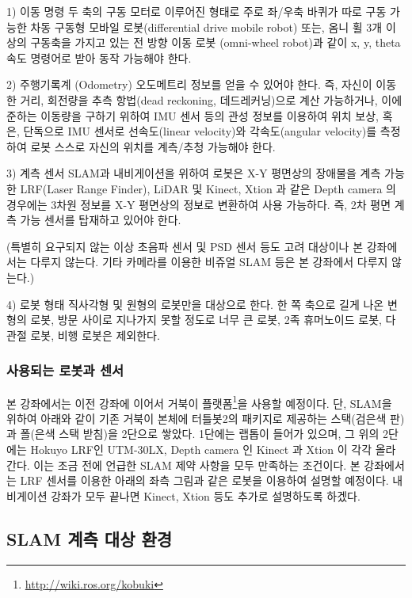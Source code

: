 1) 이동 명령
두 축의 구동 모터로 이루어진 형태로 주로 좌/우축 바퀴가 따로 구동 가능한 차동 구동형 모바일 로봇(differential drive mobile robot) 또는, 옴니 휠 3개 이상의 구동축을 가지고 있는 전 방향 이동 로봇 (omni-wheel robot)과 같이 x, y, theta 속도 명령어로 받아 동작 가능해야 한다.

2) 주행기록계 (Odometry)
오도메트리 정보를 얻을 수 있어야 한다. 즉, 자신이 이동한 거리, 회전량을 추측 항법(dead reckoning, 데드레커닝)으로 계산 가능하거나, 이에 준하는 이동량을 구하기 위하여 IMU 센서 등의 관성 정보를 이용하여 위치 보상, 혹은, 단독으로 IMU 센서로 선속도(linear velocity)와 각속도(angular velocity)를 측정하여 로봇 스스로 자신의 위치를 계측/추청 가능해야 한다.

3) 계측 센서
SLAM과 내비게이션을 위하여 로봇은 X-Y 평면상의 장애물을 계측 가능한 LRF(Laser Range Finder), LiDAR 및 Kinect, Xtion 과 같은 Depth camera 의 경우에는 3차원 정보를 X-Y 평면상의 정보로 변환하여 사용 가능하다. 즉, 2차 평면 계측 가능 센서를 탑재하고 있어야 한다. 

(특별히 요구되지 않는 이상 초음파 센서 및 PSD 센서 등도 고려 대상이나 본 강좌에서는 다루지 않는다. 기타 카메라를 이용한 비쥬얼 SLAM 등은 본 강좌에서 다루지 않는다.)

4) 로봇 형태
직사각형 및 원형의 로봇만을 대상으로 한다. 한 쪽 축으로 길게 나온 변형의 로봇, 방문 사이로 지나가지 못할 정도로 너무 큰 로봇, 2족 휴머노이드 로봇, 다관절 로봇, 비행 로봇은 제외한다.

\subsubsection{사용되는 로봇과 센서}

본 강좌에서는 이전 강좌에 이어서 거북이 플랫폼\footnote{\url{http://wiki.ros.org/kobuki}}을 사용할 예정이다. 단, SLAM을 위하여 아래와 같이 기존 거북이 본체에 터틀봇2의 패키지로 제공하는 스택(검은색 판)과 폴(은색 스택 받침)을 2단으로 쌓았다. 1단에는 랩톱이 들어가 있으며, 그 위의 2단에는 Hokuyo LRF인 UTM-30LX, Depth camera 인 Kinect 과 Xtion 이 각각 올라간다. 이는 조금 전에 언급한 SLAM 제약 사항을 모두 만족하는 조건이다. 본 강좌에서는 LRF 센서를 이용한 아래의 좌측 그림과 같은 로봇을 이용하여 설명할 예정이다. 내비게이션 강좌가 모두 끝나면 Kinect, Xtion 등도 추가로 설명하도록 하겠다.

\subsection{SLAM 계측 대상 환경}

